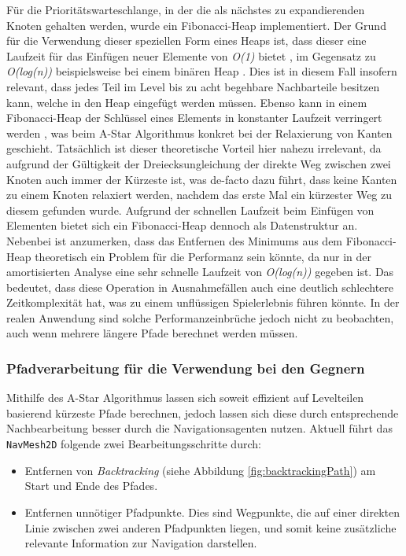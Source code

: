 Für die Prioritätswarteschlange, in der die als nächstes zu expandierenden Knoten gehalten werden, wurde ein Fibonacci-Heap implementiert. Der Grund für die Verwendung dieser speziellen Form eines Heaps ist, dass dieser eine Laufzeit für das Einfügen neuer Elemente von \textit{O(1)} bietet \cite[S. 511]{cormen}, im Gegensatz zu \textit{O(log(n))} beispielsweise bei einem binären Heap \cite[S. 164]{cormen}. Dies ist in diesem Fall insofern relevant, dass jedes Teil im Level bis zu acht begehbare Nachbarteile besitzen kann, welche in den Heap eingefügt werden müssen. Ebenso kann in einem Fibonacci-Heap der Schlüssel eines Elements in konstanter Laufzeit verringert werden \cite[S. 518]{cormen}, was beim A-Star Algorithmus konkret bei der Relaxierung von Kanten geschieht. Tatsächlich ist dieser theoretische Vorteil hier nahezu irrelevant, da aufgrund der Gültigkeit der Dreiecksungleichung der direkte Weg zwischen zwei Knoten auch immer der Kürzeste ist, was de-facto dazu führt, dass keine Kanten zu einem Knoten relaxiert werden, nachdem das erste Mal ein kürzester Weg zu diesem gefunden wurde. Aufgrund der schnellen Laufzeit beim Einfügen von Elementen bietet sich ein Fibonacci-Heap dennoch als Datenstruktur an. Nebenbei ist anzumerken, dass das Entfernen des Minimums aus dem Fibonacci-Heap theoretisch ein Problem für die Performanz sein könnte, da nur in der amortisierten Analyse eine sehr schnelle Laufzeit von \textit{O(log(n))} gegeben ist. Das bedeutet, dass diese Operation in Ausnahmefällen auch eine deutlich schlechtere Zeitkomplexität hat, was zu einem unflüssigen Spielerlebnis führen könnte. In der realen Anwendung sind solche Performanzeinbrüche jedoch nicht zu beobachten, auch wenn mehrere längere Pfade berechnet werden müssen.

\subsubsection{Pfadverarbeitung für die Verwendung bei den Gegnern}\label{sec:pathProcessing}
Mithilfe des A-Star Algorithmus lassen sich soweit effizient auf Levelteilen basierend kürzeste Pfade berechnen, jedoch lassen sich diese durch entsprechende Nachbearbeitung besser durch die Navigationsagenten nutzen. Aktuell führt das \texttt{NavMesh2D} folgende zwei Bearbeitungsschritte durch:
\begin{itemize}
	\item Entfernen von \textit{Backtracking} (siehe Abbildung \ref{fig:backtrackingPath}) am Start und Ende des Pfades.
	\item Entfernen unnötiger Pfadpunkte. Dies sind Wegpunkte, die auf einer direkten Linie zwischen zwei anderen Pfadpunkten liegen, und somit keine zusätzliche relevante Information zur Navigation darstellen.
\end{itemize}


